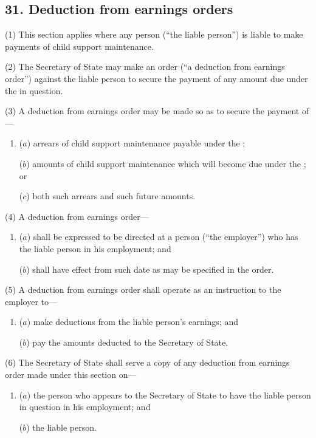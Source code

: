 \documentclass[a4paper]{article}
\begin{document}
\subsection{31. Deduction from earnings orders}

(1) This section applies where any person (“the liable person”) is liable
to make payments of child support maintenance.

(2)
The Secretary of State may make an order (“a deduction from earnings order”) against the liable person to secure the payment of any amount due under the  in question.

(3)
A deduction from earnings order may be made so as to secure the payment of---
\begin{enumerate}\item[]
($a$) arrears of child support maintenance payable under the ;

($b$) amounts of child support maintenance which will become due under the
; or

($c$) both such arrears and such future amounts.
\end{enumerate}

(4) A deduction from earnings order---
\begin{enumerate}\item[]
($a$) shall be expressed to be directed at a person (“the employer”) who has
the liable person in his employment; and

($b$) shall have effect from such date as may be specified in the order.
\end{enumerate}

(5)
A deduction from earnings order shall operate as an instruction to the employer to---
\begin{enumerate}\item[]
($a$) make deductions from the liable person’s earnings; and

($b$) pay the amounts deducted to the Secretary of State.
\end{enumerate}

(6)
The Secretary of State shall serve a copy of any deduction from earnings order made under this section on---
\begin{enumerate}\item[]
($a$) the person who appears to the Secretary of State to have the liable person
in question in his employment; and

($b$) the liable person.
\end{enumerate}
\end{document}
